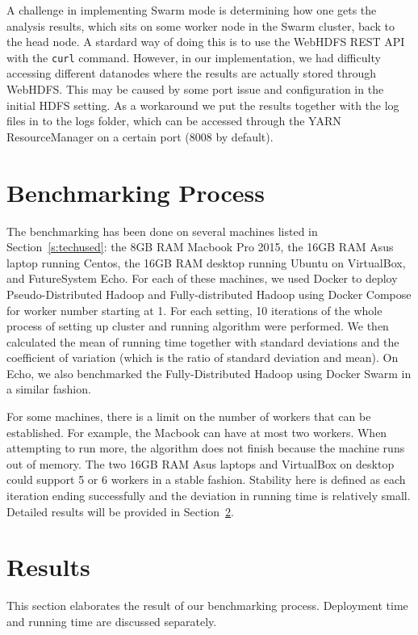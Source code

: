 A challenge in implementing Swarm mode is determining how one gets the
analysis results, which sits on some worker node in the Swarm cluster,
back to the head node. A stardard way of doing this is to use the
WebHDFS REST API with the \verb|curl| command. However, in our
implementation, we had difficulty accessing different datanodes
where the results are actually stored through WebHDFS. This may be
caused by some port issue and configuration in the initial HDFS
setting. As a workaround we put the results together with the log
files in to the logs folder, which can be accessed through the YARN
ResourceManager on a certain port (8008 by default).


\section{Benchmarking Process}\label{s:benchrproc}

The benchmarking has been done on several machines listed in
Section~\ref{s:techused}: the 8GB RAM Macbook Pro 2015, the 16GB RAM
Asus laptop running Centos, the 16GB RAM desktop running Ubuntu on
VirtualBox, and FutureSystem Echo.  For each of these machines, we
used Docker to deploy Pseudo-Distributed Hadoop and Fully-distributed
Hadoop using Docker Compose for worker number starting at 1. For each
setting, 10 iterations of the whole process of setting up cluster and
running algorithm were performed. We then calculated the mean of
running time together with standard deviations and the coefficient of
variation (which is the ratio of standard deviation and mean).  On
Echo, we also benchmarked the Fully-Distributed Hadoop using Docker
Swarm in a similar fashion.

For some machines, there is a limit on the number of workers that can
be established. For example, the Macbook can have at most two
workers. When attempting to run more, the algorithm does not finish
because the machine runs out of memory. The two 16GB RAM Asus laptops
and VirtualBox on desktop could support 5 or 6 workers in a stable
fashion.  Stability here is defined as each iteration ending
successfully and the deviation in running time is relatively
small. Detailed results will be provided in Section~\ref{s:results}.

\section{Results}\label{s:results}
This section elaborates the result of our benchmarking
process. Deployment time and running time are discussed separately.

